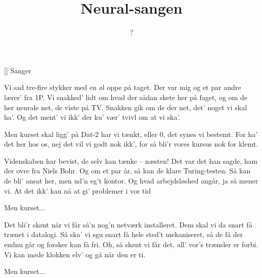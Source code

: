 \documentclass[a4paper,11pt]{article}
\title{Neural-sangen}
\author{?}
\begin{document}
\maketitle

\begin{roles}
[] Sanger
\end{roles}


\begin{song}
%
Vi sad tre-fire stykker med en øl oppe på taget.
Der var mig og et par andre lærer' fra 1P.
Vi snakked' lidt om hvad der sådan skete her på faget,
og om de her neurale net, de viste på TV.
Snakken gik om de der net, det' noget vi skal ha'.
Og det ment' vi ikk' der ku' vær' tvivl om at vi ska'.

Men kurset skal ligg' på Dat-2 har vi tænkt,
eller 0, det synes vi bestemt.
For ha' det her hos os,
nej det vil vi godt nok ikk',
for så bli'r vores kursus nok for klemt.

Videnskaben har bevist, de selv kan tænke -- næsten!
Det var det han sagde, ham der ovre fra Niels Bohr.
Og om et par år, så kan de klare Turing-testen.
Så kan de bli' ansat her, men ud'n eg't kontor.
Og hvad arbejdsløshed angår, ja så mener vi.
At det ikk' kan nå at gi' problemer i vor tid

Men kurset...

Det bli'r skønt når vi får så'n nog'n netværk installeret.
Dem skal vi da snart få trænet i datalogi.
Så ska' vi sgu snart få hele sted't mekaniseret,
så de få der endnu går og forsker kan få fri.
Oh, så skønt vi får det, all' vor's trænsler er forbi.
Vi kan møde klokken elv' og gå når den er ti.

Men kurset...
\end{song}
\end{document}
